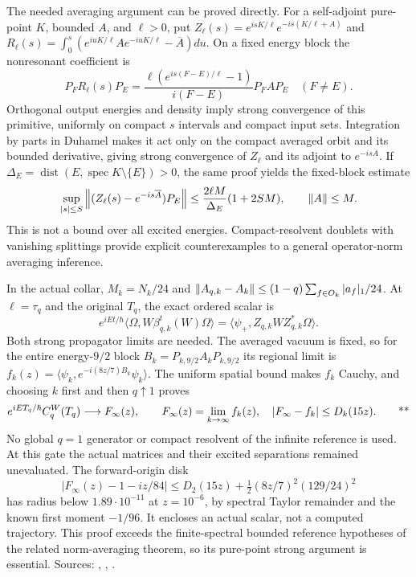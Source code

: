 The needed averaging argument can be proved directly.  For a self-adjoint
pure-point $K$, bounded $A$, and $\ell>0$, put
$Z_\ell(s)=e^{isK/\ell}e^{-is(K/\ell+A)}$ and
$R_\ell(s)=\int_0^s(e^{iuK/\ell}Ae^{-iuK/\ell}-\overline A)du$.
On a fixed energy block the nonresonant coefficient is
\begin{equation}
 P_FR_\ell(s)P_E=
 \frac{\ell(e^{is(F-E)/\ell}-1)}{i(F-E)}P_FAP_E\quad(F\ne E).
 \label{recent:averaging-primitive}
\end{equation}
Orthogonal output energies and density imply strong convergence of this
primitive, uniformly on compact $s$ intervals and compact input sets.
Integration by parts in Duhamel makes it act only on the compact averaged orbit
and its bounded derivative, giving strong convergence of $Z_\ell$ and its
adjoint to $e^{-is\overline A}$.  If
$\Delta_E=\operatorname{dist}(E,\operatorname{spec}K\setminus\{E\})>0$,
the same proof yields the fixed-block estimate
\begin{equation}
 \sup_{|s|\le S}\left\lVert (Z_\ell(s)-e^{-is\overline A})P_E\right\rVert
 \le\frac{2\ell M}{\Delta_E}(1+2SM),\qquad\left\lVert A\right\rVert\le M.
 \label{recent:averaging-block}
\end{equation}
This is not a bound over all excited energies.  Compact-resolvent doublets with
vanishing splittings provide explicit counterexamples to a general
operator-norm averaging inference.

In the actual collar, $M_k=N_k/24$ and
$\left\lVert A_{q,k}-A_k\right\rVert\le(1-q)\sum_{f\in O_k}|a_f|_1/24$.
At $\ell=\tau_q$ and the original $T_q$, the exact ordered scalar is
\begin{equation}
 e^{iEt/\hbar}\langle\Omega,W\beta_{q,k}^t(W)\Omega\rangle
 =\langle\psi_+,Z_{q,k}WZ_{q,k}^*\Omega\rangle.
 \label{recent:ordered-scalar}
\end{equation}
Both strong propagator limits are needed.  The averaged vacuum is fixed, so
for the entire energy-$9/2$ block
$B_k=P_{k,9/2}A_kP_{k,9/2}$ its regional limit is
$f_k(z)=\langle\psi_k,e^{-i(8z/7)B_k}\psi_k\rangle$.
The uniform spatial bound makes $f_k$ Cauchy, and choosing $k$ first and then
$q\uparrow1$ proves
\begin{equation}
 e^{iET_q/\hbar}C_q^W(T_q)\longrightarrow F_\infty(z),\qquad
 F_\infty(z)=\lim_{k\to\infty}f_k(z),\quad
 |F_\infty-f_k|\le D_k(15z).\qquad\text{**}
 \label{recent:scalar-limit}
\end{equation}
No global $q=1$ generator or compact resolvent of the infinite reference is
used.  At this gate the actual matrices and their excited separations remained
unevaluated.  The forward-origin disk
\begin{equation}
 |F_\infty(z)-1-iz/84|
 \le D_2(15z)+\tfrac12(8z/7)^2(129/24)^2
 \label{recent:y-disk}
\end{equation}
has radius below $1.89\cdot10^{-11}$ at $z=10^{-6}$, by spectral Taylor
remainder and the known first moment $-1/96$.  It encloses an actual scalar,
not a computed trajectory.  This proof exceeds the finite-spectral bounded
reference hypotheses of the related norm-averaging theorem, so its pure-point
strong argument is essential.
Sources: ,
,
.

